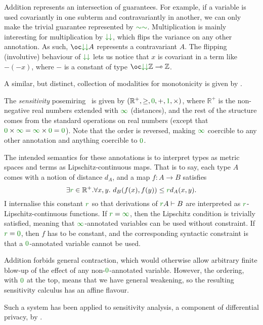 \begin{example}
{
  }

  Addition represents an intersection of guarantees.
  For example, if a variable is used covariantly in one subterm and
  contravariantly in another, we can only make the trivial guarantee represented
  by $\gr{\sim\sim}$.
  Multiplication is mainly interesting for multiplication by
  $\gr{\downarrow\downarrow}$, which flips the variance on any other annotation.
  As such, $\oc\gr{\downarrow\downarrow}A$ represents a contravariant $A$.
  The flipping (involutive) behaviour of $\gr{\downarrow\downarrow}$ lets us
  notice that $x$ is covariant in
  a term like $-(-x)$, where $-$ is a constant of type
  $\oc\gr{\downarrow\downarrow}\mathbb Z \multimap \mathbb Z$.

  A similar, but distinct, collection of modalities for monotonicity is given by
  \citet{Arntzenius19}.
\end{example}

\begin{example}\label{def:sensitivity-posemiring}
  The \emph{sensitivity} posemiring~\citep{reed10distance} is given by
  $(\mathbb R^+, \geq, \gr0, +, \gr1, \times)$, where $\mathbb R^+$ is the
  non-negative real numbers extended with $\gr\infty$ (distances), and the rest
  of the structure comes from the standard operations on real numbers (except
  that $\gr0 \times \gr\infty = \gr\infty \times \gr0 = \gr0$).
  Note that the order is reversed, making $\gr\infty$ coercible to any other
  annotation and anything coercible to $\gr0$.

  The intended semantics for these annotations is to interpret types as metric
  spaces and terms as Lipschitz-continuous maps.
  That is to say, each type $A$ comes with a notion of distance $d_A$, and a map
  $f : A \to B$ satisfies
  \[
    \exists\gr r \in \mathbb R^+.\forall x,y.~%
    d_B(f(x), f(y)) \leq \gr rd_A(x, y).
  \]
  I internalise this constant $\gr r$ so that derivations of
  $\gr rA \vdash B$ are interpreted as $\gr r$-Lipschitz-continuous functions.
  If $\gr r = \gr\infty$, then the Lipschitz condition is trivially satisfied,
  meaning that $\gr\infty$-annotated variables can be used without constraint.
  If $\gr r = \gr0$, then $f$ has to be constant, and the corresponding
  syntactic constraint is that a $\gr0$-annotated variable cannot be used.

  Addition forbids general contraction, which would otherwise allow arbitrary
  finite blow-up of the effect of any non-$\gr0$-annotated variable.
  However, the ordering, with $\gr0$ at the top, means that we have general
  weakening, so the resulting sensitivity calculus has an affine flavour.

  Such a system has been applied to sensitivity analysis, a component of
  differential privacy, by \citet{reed10distance}.
\end{example}
